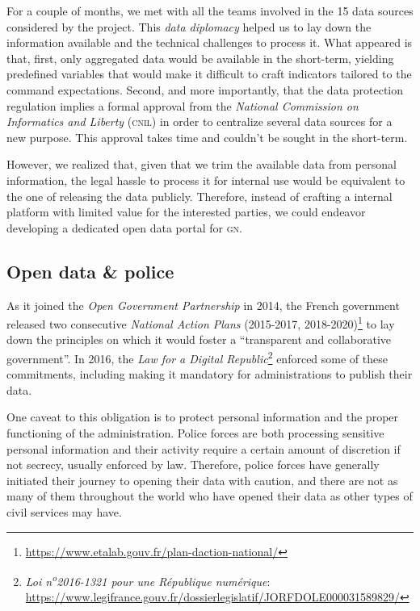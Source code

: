 \documentclass[11pt,a4paper,twocolumn,USenglish]{article}
\begin{document}
For a couple of months, we met with all the teams involved in the 15 data sources considered by the project. This \emph{data diplomacy} helped us to lay down the information available and the technical challenges to process it. What appeared is that, first, only aggregated data would be available in the short-term, yielding predefined variables that would make it difficult to craft indicators tailored to the command expectations. Second, and more importantly, that the data protection regulation implies a formal approval from the \emph{National Commission on Informatics and Liberty} (\textsc{cnil}) in order to centralize several data sources for a new purpose. This approval takes time and couldn't be sought in the short-term.

However, we realized that, given that we trim the available data from personal information, the legal hassle to process it for internal use would be equivalent to the one of releasing the data publicly. Therefore, instead of crafting a internal platform with limited value for the interested parties, we could endeavor developing a dedicated open data portal for \textsc{gn}.


\subsection*{Open data \& police}

As it joined the \emph{Open Government Partnership} in 2014, the French government released two consecutive \emph{National Action Plans} (2015-2017, 2018-2020)\footnote{\url{https://www.etalab.gouv.fr/plan-daction-national/}} to lay down the principles on which it would foster a ``transparent and collaborative government''. In 2016, the \emph{Law for a Digital Republic}\footnote{\emph{Loi n\textsuperscript{o}2016-1321 pour une République numérique}: \url{https://www.legifrance.gouv.fr/dossierlegislatif/JORFDOLE000031589829/}} enforced some of these commitments, including making it mandatory for administrations to publish their data.

One caveat to this obligation is to protect personal information and the proper functioning of the administration. Police forces are both processing sensitive personal information and their activity require a certain amount of discretion if not secrecy, usually enforced by law. Therefore, police forces have generally initiated their journey to opening their data with caution, and there are not as many of them throughout the world who have opened their data as other types of civil services may have.
\end{document}
